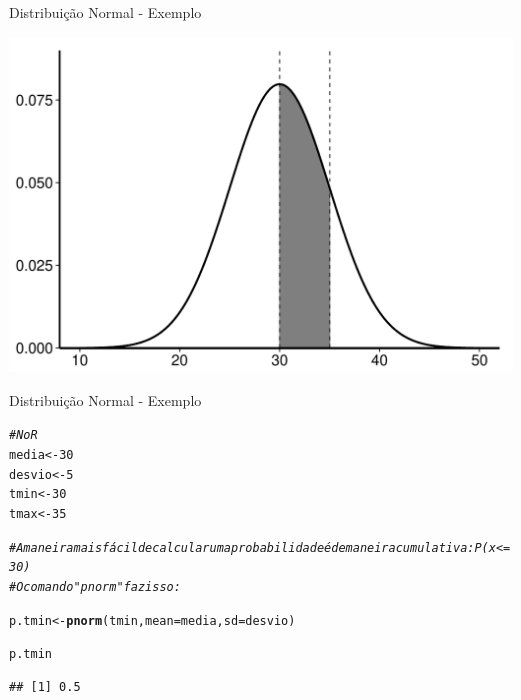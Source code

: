 \documentclass{beamer}\usepackage[]{graphicx}\usepackage[]{color}
\makeatletter
\def\maxwidth{ %
  \ifdim\Gin@nat@width>\linewidth
    \linewidth
  \else
    \Gin@nat@width
  \fi
}
\newcommand{\hlnum}[1]{\textcolor[rgb]{0.686,0.059,0.569}{#1}}%
\newcommand{\hlcom}[1]{\textcolor[rgb]{0.678,0.584,0.686}{\textit{#1}}}%
\newcommand{\hlstd}[1]{\textcolor[rgb]{0.345,0.345,0.345}{#1}}%
\newcommand{\hlkwb}[1]{\textcolor[rgb]{0.69,0.353,0.396}{#1}}%
\newcommand{\hlkwc}[1]{\textcolor[rgb]{0.333,0.667,0.333}{#1}}%
\newcommand{\hlkwd}[1]{\textcolor[rgb]{0.737,0.353,0.396}{\textbf{#1}}}%
\newenvironment{kframe}{%
 \def\at@end@of@kframe{}%
 \ifinner\ifhmode%
  \def\at@end@of@kframe{\end{minipage}}%
  \begin{minipage}{\columnwidth}%
 \fi\fi%
 \def\FrameCommand##1{\hskip\@totalleftmargin \hskip-\fboxsep
 \colorbox{shadecolor}{##1}\hskip-\fboxsep
     \hskip-\linewidth \hskip-\@totalleftmargin \hskip\columnwidth}%
 \MakeFramed {\advance\hsize-\width
   \@totalleftmargin\z@ \linewidth\hsize
   \@setminipage}}%
 {\par\unskip\endMakeFramed%
 \at@end@of@kframe}
\newenvironment{knitrout}{}{} %
\renewenvironment{knitrout}{\setlength{\topsep}{0mm}}{}
\makeatother
\begin{document}
\begin{frame}[fragile]{Distribuição Normal - Exemplo}


\begin{knitrout}
\color{fgcolor}
\includegraphics[width=\maxwidth,height=0.7\textheight]{figure/normex-1} 

\end{knitrout}

\end{frame} 


\begin{frame}[fragile]{Distribuição Normal - Exemplo}


\begin{knitrout}\tiny
{}\color{fgcolor}\begin{kframe}
\begin{alltt}
\hlcom{# No R}
\hlstd{media} \hlkwb{<-} \hlnum{30}
\hlstd{desvio} \hlkwb{<-} \hlnum{5}
\hlstd{tmin} \hlkwb{<-} \hlnum{30}
\hlstd{tmax} \hlkwb{<-} \hlnum{35}

\hlcom{# A maneira mais fácil de calcular uma probabilidade é de maneira cumulativa: P(x <= 30)}
\hlcom{#O comando "pnorm" faz isso:}

\hlstd{p.tmin} \hlkwb{<-} \hlkwd{pnorm}\hlstd{(tmin,}\hlkwc{mean}\hlstd{=media,}\hlkwc{sd}\hlstd{=desvio)}

\hlstd{p.tmin}
\end{alltt}
\begin{verbatim}
## [1] 0.5
\end{verbatim}
\end{kframe}
\end{knitrout}

\end{frame} 
\end{document}

